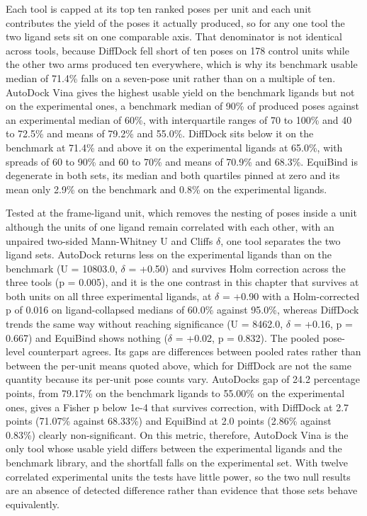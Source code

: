 Each tool is capped at its top ten ranked poses per unit and each unit contributes the yield of the poses it actually produced, so for any one tool the two ligand sets sit on one comparable axis. That denominator is not identical across tools, because DiffDock fell short of ten poses on 178 control units while the other two arms produced ten everywhere, which is why its benchmark usable median of 71.4\% falls on a seven-pose unit rather than on a multiple of ten. AutoDock Vina gives the highest usable yield on the benchmark ligands but not on the experimental ones, a benchmark median of 90\% of produced poses against an experimental median of 60\%, with interquartile ranges of 70 to 100\% and 40 to 72.5\% and means of 79.2\% and 55.0\%. DiffDock sits below it on the benchmark at 71.4\% and above it on the experimental ligands at 65.0\%, with spreads of 60 to 90\% and 60 to 70\% and means of 70.9\% and 68.3\%. EquiBind is degenerate in both sets, its median and both quartiles pinned at zero and its mean only 2.9\% on the benchmark and 0.8\% on the experimental ligands.

Tested at the frame-ligand unit, which removes the nesting of poses inside a unit although the units of one ligand remain correlated with each other, with an unpaired two-sided Mann-Whitney U and Cliff\textquotesingle s \ensuremath{\delta}, one tool separates the two ligand sets. AutoDock returns less on the experimental ligands than on the benchmark (U = 10803.0, \ensuremath{\delta} = +0.50) and survives Holm correction across the three tools (p = 0.005), and it is the one contrast in this chapter that survives at both units on all three experimental ligands, at \ensuremath{\delta} = +0.90 with a Holm-corrected p of 0.016 on ligand-collapsed medians of 60.0\% against 95.0\%, whereas DiffDock trends the same way without reaching significance (U = 8462.0, \ensuremath{\delta} = +0.16, p = 0.667) and EquiBind shows nothing (\ensuremath{\delta} = +0.02, p = 0.832). The pooled pose-level counterpart agrees. Its gaps are differences between pooled rates rather than between the per-unit means quoted above, which for DiffDock are not the same quantity because its per-unit pose counts vary. AutoDock\textquotesingle s gap of 24.2 percentage points, from 79.17\% on the benchmark ligands to 55.00\% on the experimental ones, gives a Fisher p below 1e-4 that survives correction, with DiffDock at 2.7 points (71.07\% against 68.33\%) and EquiBind at 2.0 points (2.86\% against 0.83\%) clearly non-significant. On this metric, therefore, AutoDock Vina is the only tool whose usable yield differs between the experimental ligands and the benchmark library, and the shortfall falls on the experimental set. With twelve correlated experimental units the tests have little power, so the two null results are an absence of detected difference rather than evidence that those sets behave equivalently.

